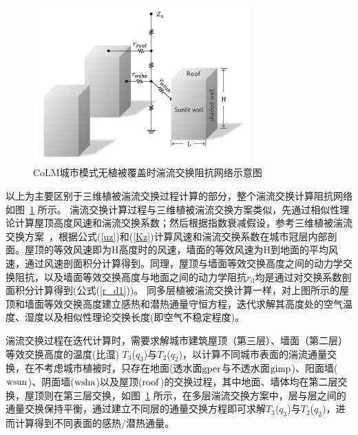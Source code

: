 {
  \begin{figure}[htbp]
    \centering
    \includegraphics[width=0.75\textwidth]{Figures/城市模式/CoLM城市模式无植被阻抗交换网络_v2.png}
    \caption{CoLM城市模式无植被覆盖时湍流交换阻抗网络示意图}
    \label{fig:无植被覆盖时城市湍流交换阻抗示意图}
  \end{figure}
}

以上为主要区别于三维植被湍流交换过程计算的部分，整个湍流交换计算阻抗网络如图~\ref{fig:无植被覆盖时城市湍流交换阻抗示意图} 所示。
湍流交换计算过程与三维植被湍流交换方案类似，先通过相似性理论计算屋顶高度风速和湍流交换系数；然后根据指数衰减假设，参考三维植被湍流交换方案~\citep{dai2019different}，根据公式(\ref{uz})和(\ref{Kz})计算风速和湍流交换系数在城市冠层内部剖面。屋顶的等效风速即为H高度时的风速，墙面的等效风速为H到地面的平均风速，通过风速剖面积分计算得到。同理，屋顶与墙面等效交换高度之间的动力学交换阻抗，以及墙面等效交换高度与地面之间的动力学阻抗$r_{\mathrm {d}}$均是通过对交换系数剖面积分计算得到(公式(\ref{r_d1}))。
同多层植被湍流交换计算一样，对上图所示的屋顶和墙面等效交换高度建立感热和潜热通量守恒方程，迭代求解其高度处的空气温度、湿度以及相似性理论交换长度(即空气不稳定程度)。

湍流交换过程在迭代计算时，需要求解城市建筑屋顶（第三层）、墙面（第二层）等效交换高度的温度(比湿) $T_3$($q_3$)与$T_2$($q_2$)，以计算不同城市表面的湍流通量交换，在不考虑城市植被时，只存在地面(透水面$\rm gper$与不透水面$\rm gimp$)、阳面墙($\rm wsun$)、阴面墙($\rm wsha$)以及屋顶($\rm roof$)的交换过程，其中地面、墙体均在第二层交换，屋顶则在第三层交换，如图~\ref{fig:无植被覆盖时城市湍流交换阻抗示意图} 所示，在多层湍流交换方案中，层与层之间的通量交换保持平衡，通过建立不同层的通量交换方程即可求解$T_3$($q_3$)与$T_2$($q_2$)，进而计算得到不同表面的感热/潜热通量。

